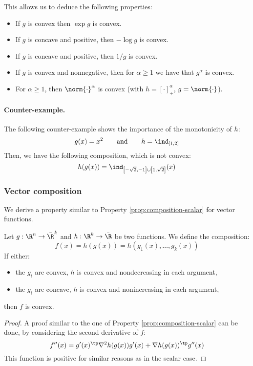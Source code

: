 \begin{example}
    This allows us to deduce the following properties:
    \begin{itemize}
        \item If $g$ is convex then $\exp g$ is convex.
        \item If $g$ is concave and positive, then $-\log g$ is convex.
        \item If $g$ is concave and positive, then $1/g$ is convex.
        \item If $g$ is convex and nonnegative, then for $\alpha\geq1$ we have that $g^\alpha$ is convex.
        \item For $\alpha\geq1$, then $\norm{\cdot}^\alpha$ is convex (with $h=[\cdot]^\alpha_+$, $g=\norm{\cdot}$).
    \end{itemize}
\end{example}

\paragraph*{Counter-example.}
The following counter-example shows the importance of the monotonicity of $h$:
\begin{equation*}
    g(x)=x^2 \qquad \text{and} \qquad h = \ind_{[1, 2]}
\end{equation*}
Then, we have the following composition, which is not convex:
\begin{equation*}
    h(g(x)) = \ind_{\left[-\sqrt{2}, -1\right]\cup\left[1, \sqrt{2}\right]}(x)
\end{equation*}

\subsubsection{Vector composition}
We derive a property similar to Property \ref{prop:composition-scalar} for vector functions.

\begin{property}
    Let $g:\R^n\to\bar{\R}^k$ and $h:\R^k\to\bar{\R}$ be two functions. We define the composition:
    \begin{equation*}
        f(x) = h(g(x)) = h(g_1(x), \dots, g_k(x))
    \end{equation*}
    If either:
    \begin{itemize}
        \item the $g_i$ are convex, $h$ is convex and nondecreasing in each argument,
        \item the $g_i$ are concave, $h$ is convex and nonincreasing in each argument,
    \end{itemize}
    then $f$ is convex.
\end{property}
\begin{proof}
    A proof similar to the one of Property \ref{prop:composition-scalar} can be done, by considering the second derivative of $f$:
    \begin{equation*}
        f''(x) = g'(x)^\tp\nabla^2h(g(x))g'(x)+\nabla h(g(x))^\tp g''(x)
    \end{equation*}
    This function is positive for similar reasons as in the scalar case.
\end{proof}

